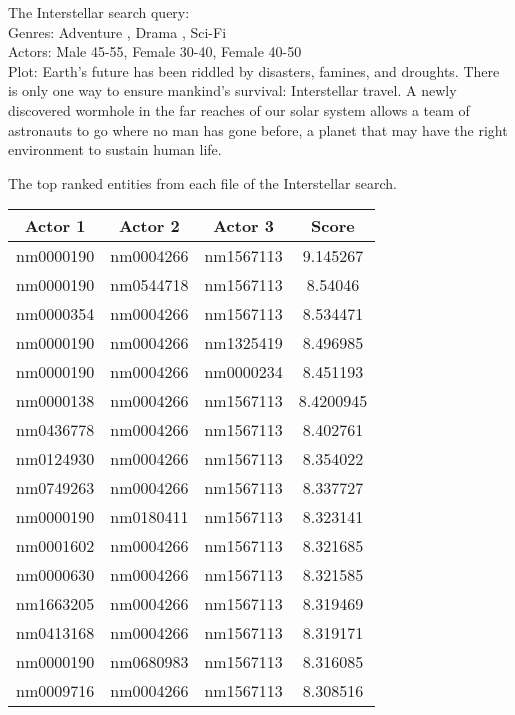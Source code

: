The Interstellar search query:\\
Genres: Adventure , Drama , Sci-Fi\\
Actors: Male 45-55, Female 30-40, Female 40-50\\
Plot: Earth's future has been riddled by disasters, famines, and droughts. There is only one way to ensure mankind's survival: Interstellar travel. A newly discovered wormhole in the far reaches of our solar system allows a team of astronauts to go where no man has gone before, a planet that may have the right environment to sustain human life.


The top ranked entities from each file of the Interstellar search.

\begin{table}[H]
    \centering
        \begin{tabular}{ |c|c|c|c| } 
            \hline
            \textbf{Actor 1} & \textbf{Actor 2} & \textbf{Actor 3} & \textbf{Score} \\ 
            \hline
            nm0000190 & nm0004266 & nm1567113 & 9.145267 \\
            nm0000190 & nm0544718 & nm1567113 & 8.54046 \\
            nm0000354 & nm0004266 & nm1567113 & 8.534471 \\
            nm0000190 & nm0004266 & nm1325419 & 8.496985 \\
            nm0000190 & nm0004266 & nm0000234 & 8.451193 \\
            nm0000138 & nm0004266 & nm1567113 & 8.4200945 \\
            nm0436778 & nm0004266 & nm1567113 & 8.402761 \\
            nm0124930 & nm0004266 & nm1567113 & 8.354022 \\
            nm0749263 & nm0004266 & nm1567113 & 8.337727 \\
            nm0000190 & nm0180411 & nm1567113 & 8.323141 \\
            nm0001602 & nm0004266 & nm1567113 & 8.321685 \\
            nm0000630 & nm0004266 & nm1567113 & 8.321585 \\
            nm1663205 & nm0004266 & nm1567113 & 8.319469 \\
            nm0413168 & nm0004266 & nm1567113 & 8.319171 \\
            nm0000190 & nm0680983 & nm1567113 & 8.316085 \\
            nm0009716 & nm0004266 & nm1567113 & 8.308516 \\

\end{tabular}
\end{table}
